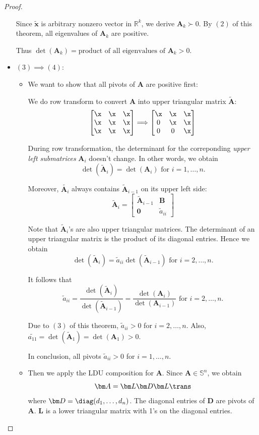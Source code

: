 \begin{proof}
\begin{itemize}
Since $\tilde{\bm x}$ is arbitrary nonzero vector in $\mathbb{R}^{k}$, we derive $\bm A_k\succ0.$ By $(2)$ of this theorem, all eigenvalues of $\bm A_k$ are positive. 

Thus $\det(\bm A_k)=\text{product of all eigenvalues of $\bm A_k$}>0.$
\item
$(3)\implies(4):$
\begin{itemize}
\item
We want to show that all pivots of $\bm A$ are positive first:

We do row transform to convert $\bm A$ into upper triangular matrix $\tilde{\bm A}$:
\[
\begin{bmatrix}
\x&\x&\x\\
\x&\x&\x\\
\x&\x&\x
\end{bmatrix}\Longrightarrow
\begin{bmatrix}
\x&\x&\x\\
0&\x&\x\\
0&0&\x
\end{bmatrix}
\]

During row transformation, the determinant for the  correponding \textit{upper left submatrices} $\bm A_i$ doesn't change. In other words, we obtain
\[
\det(\tilde{\bm A}_i)=\det(\bm A_i)\text{ for }i=1,\dots,n.
\]

Moreover, $\tilde{\bm A_i}$ always contains $\tilde{\bm A}_{i-1}$ on its upper left side:
\[
\tilde{\bm A}_i=\begin{bmatrix}
\tilde{\bm A}_{i-1}&\bm B\\\bm0&\tilde{a}_{ii}
\end{bmatrix}
\]

Note that $\tilde{\bm A}_i$'s are also upper triangular matrices. The determinant of an upper triangular matrix is the product of its diagonal entries. Hence we obtain
\[
\det(\tilde{\bm A}_i)=\tilde{a}_{ii}\det(\tilde{\bm A}_{i-1})\text{ for }i=2,\dots,n.
\]

It follows that
\[
\tilde{a}_{ii}=\frac{\det(\tilde{\bm A}_i)}{\det(\tilde{\bm A}_{i-1})}=\frac{\det(\bm A_i)}{\det(\bm A_{i-1})}\text{ for }i=2,\dots,n.
\]

Due to $(3)$ of this theorem, $\tilde{a}_{ii}>0$ for $i=2,\dots,n.$  Also, $\tilde{a_{11}}=\det(\tilde{\bm A}_1)=\det(\bm A_1)>0$.

In conclusion, all pivots $\tilde{a}_{ii}>0$ for $i=1,\dots,n.$
\item
Then we apply the LDU composition for $\bm A$. Since $\bm A\in\mathbb{S}^n$, we obtain
\[
\bm A=\bm L\bm D\bm L\trans
\]
where $\bm D=\diag(d_1,\dots,d_n)$. The diagonal entries of $\bm D$ are pivots of $\bm A$. $\bm L$ is a lower triangular matrix with 1's on the diagonal entries.


\end{itemize}
\end{itemize}
\end{proof}
